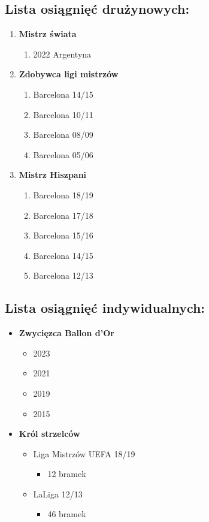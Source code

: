 \subsection {Lista osiągnięć drużynowych: }
\begin{enumerate}
    \item \textbf{Mistrz świata} 
    \begin{enumerate}
        \item 2022 Argentyna
    \end{enumerate}
    \item \textbf{Zdobywca ligi mistrzów}
    \begin{enumerate}
        \item Barcelona 14/15
        \item Barcelona 10/11
        \item Barcelona 08/09
        \item Barcelona 05/06
    \end{enumerate}
    \item \textbf{Mistrz Hiszpani} 
    \begin{enumerate}
        \item Barcelona 18/19
        \item Barcelona 17/18
        \item Barcelona 15/16
        \item Barcelona 14/15
        \item Barcelona 12/13
    \end{enumerate}

\end{enumerate}
\subsection{Lista osiągnięć indywidualnych: }
\begin{itemize}
    \item \textbf{Zwycięzca Ballon d'Or}
    \begin{itemize}
        \item 2023
        \item 2021
        \item 2019
        \item 2015
    \end{itemize}
    \item \textbf{Król strzelców}
    \begin{itemize}
        \item Liga Mistrzów UEFA 18/19
        \begin{itemize}
            \item 12 bramek
        \end{itemize}
        \item LaLiga 12/13
        \begin{itemize}
            \item 46 bramek
        \end{itemize}
    \end{itemize}
\end{itemize}

